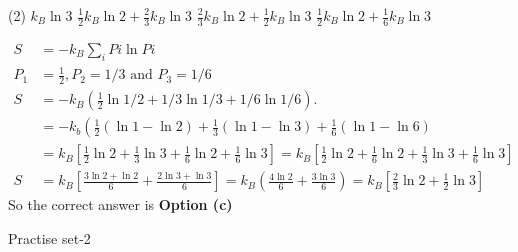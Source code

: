 \begin{enumerate}
	{	}
	\begin{tasks}(2)
		\task[\textbf{a.}] $k_{B} \ln 3$
		\task[\textbf{b.}]$\frac{1}{2} k_{B} \ln 2+\frac{2}{3} k_{B} \ln 3$
		\task[\textbf{c.}]$\frac{2}{3} k_{B} \ln 2+\frac{1}{2} k_{B} \ln 3$
		\task[\textbf{d.}] $\frac{1}{2} k_{B} \ln 2+\frac{1}{6} k_{B} \ln 3$
	\end{tasks}
	\begin{answer}
		\begin{align*}
		S&=-k_{B} \sum_{i} P i \ln P i\\
		P_{1}&=\frac{1}{2}, P_{2}=1 / 3 \text { and } P_{3}=1 / 6 \\
		S&=-k_{B}\left(\frac{1}{2} \ln 1 / 2+1 / 3 \ln 1 / 3+1 / 6 \ln 1 / 6\right) . \\
		&=-k_{b}\left(\frac{1}{2}(\ln 1-\ln 2)+\frac{1}{3}(\ln 1-\ln 3)+\frac{1}{6}(\ln 1-\ln 6)\right. \\
		&=k_{B}\left[\frac{1}{2} \ln 2+\frac{1}{3} \ln 3+\frac{1}{6} \ln 2+\frac{1}{6} \ln 3\right]=k_{B}\left[\frac{1}{2} \ln 2+\frac{1}{6} \ln 2+\frac{1}{3} \ln 3+\frac{1}{6} \ln 3\right] \\
		S&=k_{B}\left[\frac{3 \ln 2+\ln 2}{6}+\frac{2 \ln 3+\ln 3}{6}\right]=k_{B}\left(\frac{4 \ln 2}{6}+\frac{3 \ln 3}{6}\right)=k_{B}\left[\frac{2}{3} \ln 2+\frac{1}{2} \ln 3\right]
		\end{align*}
		So the correct answer is \textbf{Option (c)}
	\end{answer}
\end{enumerate}
\newpage
\begin{abox}
	Practise set-2
\end{abox}
